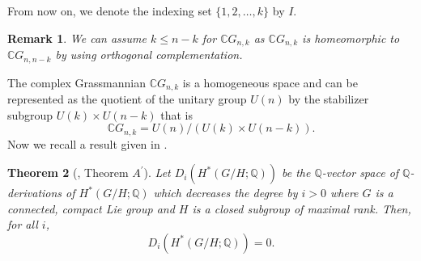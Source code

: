 \documentclass{amsart}
\newtheorem{theorem}{Theorem}[section]
\newtheorem{remark}[theorem]{Remark}
\newcommand{\rank}{\mathrm{Rank}}
\begin{document}
	From now on, we denote the indexing set $\{1,2,\dots, k\}$ by $I$.
	\begin{remark}
		We can assume  $k\leq n-k$ for  $\mathbb{C}G_{n,k}$ as $\mathbb{C}G_{n,k}$ is homeomorphic to $\mathbb{C}G_{n,n-k}$ by using orthogonal complementation.
	\end{remark}
	The complex Grassmannian $\mathbb{C}G_{n,k}$ is a homogeneous space and can be represented as the quotient of the unitary group $U(n)$ by the stabilizer subgroup $U(k)\times U(n-k)$ that is 
	\begin{equation}\label{cgn as hom}
		\mathbb{C}G_{n,k} = U(n)/ (U(k)\times U(n-k)). 
	\end{equation} Now we recall a result given in \cite{shiga-tezuka}.    
	\begin{theorem}[\cite{shiga-tezuka}, Theorem \(A^{'}\)]\label{Tezuka}
		Let $D_i(H^*(G/H;\mathbb{Q}))$ be the $\mathbb{Q}$-vector space of $\mathbb{Q}$-derivations of $H^*(G/H;\mathbb{Q})$ which decreases the degree by $i>0$ where $G$ is a connected, compact Lie group and $H$ is a closed subgroup of maximal rank.
		Then, for all $i$, $$D_i(H^*(G/H;\mathbb{Q})) =0.$$  
	\end{theorem}
\end{document}
